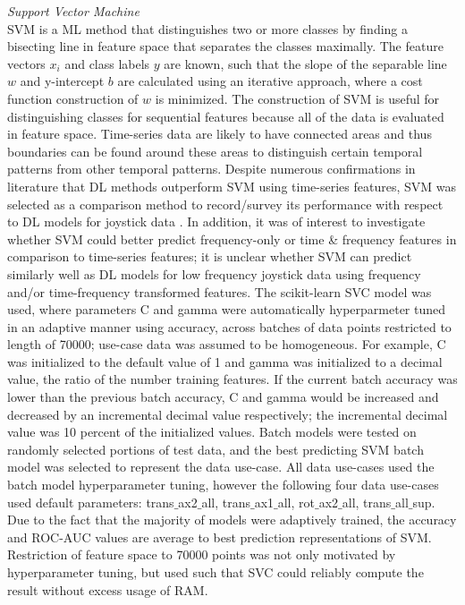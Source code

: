 \documentclass{ieeeaccess}
\begin{document}
\noindent \emph{Support Vector Machine}\\
SVM is a ML method that distinguishes two or more classes by finding a bisecting line in feature space that separates the classes maximally. The feature vectors $x_i$ and class labels $y$ are known, such that the slope of the separable line $w$ and y-intercept $b$ are calculated using an iterative approach, where a cost function construction of $w$ is minimized\cite{Burkov_2019_ML, Anguita_2012_SVMHumanActivity}. The construction of SVM is useful for distinguishing classes for sequential features because all of the data is evaluated in feature space. Time-series data are likely to have connected areas and thus boundaries can be found around these areas to distinguish certain temporal patterns from other temporal patterns. Despite numerous confirmations in literature that DL methods outperform SVM using time-series features, SVM was selected as a comparison method to record/survey its performance with respect to DL models for joystick data \cite{Xiao_2003_DeepLearning}. In addition, it was of interest to investigate whether SVM could better predict frequency-only or time \& frequency features in comparison to time-series features; it is unclear whether SVM can predict similarly well as DL models for low frequency joystick data using frequency and/or time-frequency transformed features. The scikit-learn SVC model was used, where parameters C and gamma were automatically hyperparmeter tuned in an adaptive manner using accuracy, across batches of data points restricted to length of 70000; use-case data was assumed to be homogeneous. For example, C was initialized to the default value of 1 and gamma was initialized to a decimal value, the ratio of the number training features. If the current batch accuracy was lower than the previous batch accuracy, C and gamma would be increased and decreased by an incremental decimal value respectively; the incremental decimal value was 10 percent of the initialized values. Batch models were tested on randomly selected portions of test data, and the best predicting SVM batch model was selected to represent the data use-case. All data use-cases used the batch model hyperparameter tuning, however the following four data use-cases used default parameters: trans$\_$ax2$\_$all, trans$\_$ax1$\_$all, rot$\_$ax2$\_$all, trans$\_$all$\_$sup. Due to the fact that the majority of models were adaptively trained, the accuracy and ROC-AUC values are average to best prediction representations of SVM. Restriction of feature space to 70000 points was not only motivated by hyperparameter tuning, but used such that SVC could reliably compute the result without excess usage of RAM.\\
\end{document}
